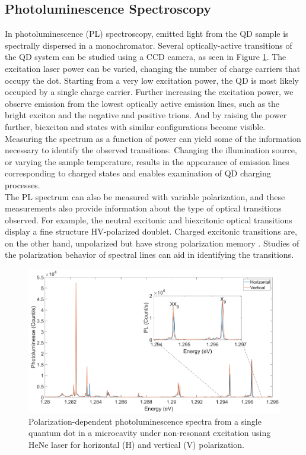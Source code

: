 \subsection{Photoluminescence Spectroscopy}
In photoluminescence (PL) spectroscopy, emitted light from the QD sample is spectrally dispersed in a monochromator. Several optically-active transitions of the QD system can be studied using a CCD camera, as seen in Figure \ref{fig:Spectrum_HV}. The excitation laser power can be varied, changing the number of charge carriers that occupy the dot. Starting from a very low excitation power, the QD is most likely occupied by a single charge carrier. Further increasing the excitation power, we observe emission from the lowest optically active emission lines, such as the bright exciton and the negative and positive trions. And by raising the power further, biexciton and states with similar configurations become visible. Measuring the spectrum as a function of power can yield some of the information necessary to identify the observed transitions. Changing the illumination source, or varying the sample temperature, results in the appearance of emission lines corresponding to charged states and enables examination of QD charging processes.\\
The PL spectrum can also be measured with variable polarization, and these measurements also provide information about the type of optical transitions observed. For example, the neutral excitonic and biexcitonic optical transitions display a fine structure HV-polarized doublet. Charged excitonic transitions are, on the other hand, unpolarized but have strong polarization memory \cite{poem2009}. Studies of the polarization behavior of spectral lines can aid in identifying the transitions.
\begin{figure}[H]
		\centering
		\includegraphics[scale=0.3]{figures/Spectrum_H_V.png}
		\caption{Polarization-dependent photoluminescence spectra from a single quantum dot in a microcavity under non-resonant excitation using HeNe laser for horizontal (H) and vertical (V) polarization.}
		\label{fig:Spectrum_HV}
	\end{figure}
